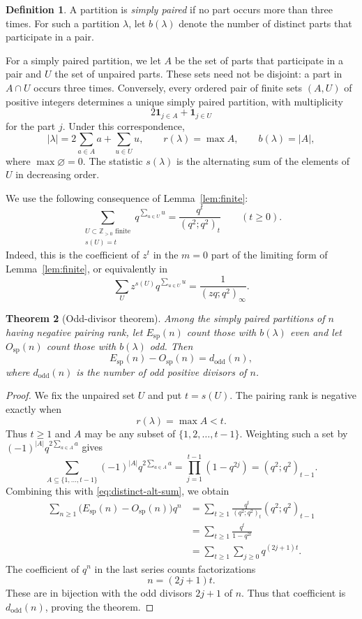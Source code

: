 \documentclass[11pt]{article}
\newtheorem{theorem}{Theorem}[section]
\theoremstyle{definition}
\newtheorem{definition}[theorem]{Definition}
\theoremstyle{remark}
\begin{document}
\begin{definition}
A partition is \emph{simply paired} if no part occurs more than three times.  For such a partition $\lambda$, let $b(\lambda)$ denote the number of distinct parts that participate in a pair.
\end{definition}

For a simply paired partition, we let $A$ be the set of parts that participate in a pair and $U$ the set of unpaired parts.  These sets need not be disjoint: a part in $A\cap U$ occurs three times.  Conversely, every ordered pair of finite sets $(A,U)$ of positive integers determines a unique simply paired partition, with multiplicity
\[
 2\mathbf{1}_{j\in A}+\mathbf{1}_{j\in U}
\]
for the part $j$.  Under this correspondence,
\[
 |\lambda|=2\sum_{a\in A}a+\sum_{u\in U}u,
 \qquad
 r(\lambda)=\max A,
 \qquad
 b(\lambda)=|A|,
\]
where $\max\varnothing=0$.  The statistic $s(\lambda)$ is the alternating sum of the elements of $U$ in decreasing order.

We use the following consequence of Lemma~\ref{lem:finite}:
\begin{equation}\label{eq:distinct-alt-sum}
 \sum_{\substack{U\subset\mathbb Z_{>0}\text{ finite}\\s(U)=t}}
 q^{\sum_{u\in U}u}
 =\frac{q^t}{(q^2;q^2)_t}
 \qquad(t\geq0).
\end{equation}
Indeed, this is the coefficient of $z^t$ in the $m=0$ part of the limiting form of Lemma~\ref{lem:finite}, or equivalently in
\[
 \sum_U z^{s(U)}q^{\sum_{u\in U}u}
 =\frac{1}{(zq;q^2)_\infty}.
\]

\begin{theorem}[Odd-divisor theorem]\label{thm:odd-divisor}
Among the simply paired partitions of $n$ having negative pairing rank, let $E_{\mathrm{sp}}(n)$ count those with $b(\lambda)$ even and let $O_{\mathrm{sp}}(n)$ count those with $b(\lambda)$ odd.  Then
\[
 E_{\mathrm{sp}}(n)-O_{\mathrm{sp}}(n)=d_{\mathrm{odd}}(n),
\]
where $d_{\mathrm{odd}}(n)$ is the number of odd positive divisors of $n$.
\end{theorem}

\begin{proof}
We fix the unpaired set $U$ and put $t=s(U)$.  The pairing rank is negative exactly when
\[
 r(\lambda)=\max A<t.
\]
Thus $t\geq1$ and $A$ may be any subset of $\{1,2,\ldots,t-1\}$.  Weighting such a set by $(-1)^{|A|}q^{2\sum_{a\in A}a}$ gives
\[
 \sum_{A\subseteq\{1,\ldots,t-1\}}
 (-1)^{|A|}q^{2\sum_{a\in A}a}
 =\prod_{j=1}^{t-1}(1-q^{2j})
 =(q^2;q^2)_{t-1}.
\]
Combining this with \eqref{eq:distinct-alt-sum}, we obtain
\begin{align*}
 \sum_{n\geq1}\bigl(E_{\mathrm{sp}}(n)-O_{\mathrm{sp}}(n)\bigr)q^n
 &=\sum_{t\geq1}
 \frac{q^t}{(q^2;q^2)_t}(q^2;q^2)_{t-1}\\
 &=\sum_{t\geq1}\frac{q^t}{1-q^{2t}}\\
 &=\sum_{t\geq1}\sum_{j\geq0}q^{(2j+1)t}.
\end{align*}
The coefficient of $q^n$ in the last series counts factorizations
\[
 n=(2j+1)t.
\]
These are in bijection with the odd divisors $2j+1$ of $n$.  Thus that coefficient is $d_{\mathrm{odd}}(n)$, proving the theorem.
\end{proof}
\end{document}

